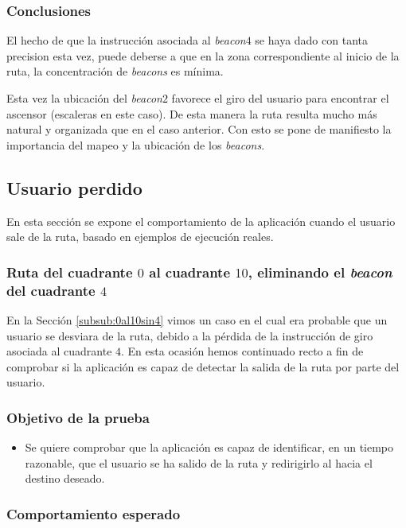 \subsubsection*{Conclusiones}

El hecho de que la instrucción asociada al \textit{beacon$4$} se haya dado con tanta precision esta vez, puede deberse a que en la zona correspondiente al inicio de la ruta, la concentración de \textit{beacons} es mínima.

Esta vez la ubicación del \textit{beacon$2$} favorece el giro del usuario para encontrar el ascensor (escaleras en este caso). De esta manera la ruta resulta mucho más natural y organizada que en el caso anterior. Con esto se pone de manifiesto la importancia del mapeo y la ubicación de los \textit{beacons}.


\subsection{Usuario perdido}
\label{sub:usuarioPerdido}

En esta sección se expone el comportamiento de la aplicación cuando el usuario sale de la ruta, basado en ejemplos de ejecución reales. 

\subsubsection{Ruta del cuadrante $0$ al cuadrante $10$, eliminando el \textit{beacon} del cuadrante $4$}

En la Sección \ref{subsub:0al10sin4} vimos un caso en el cual era probable que un usuario se desviara de la ruta, debido a la pérdida de la instrucción de giro asociada al cuadrante $4$. En esta ocasión hemos continuado recto a fin de comprobar si la aplicación es capaz de detectar la salida de la ruta por parte del usuario. 

\subsubsection*{Objetivo de la prueba}

\begin{itemize}
	\item Se quiere comprobar que la aplicación es capaz de identificar, en un tiempo razonable, que el usuario se ha salido de la ruta y redirigirlo al hacia el destino deseado.
\end{itemize}


\subsubsection*{Comportamiento esperado}

